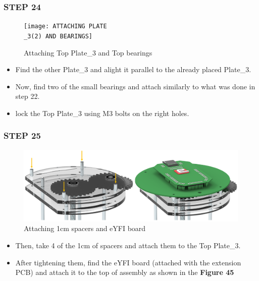 \documentclass[12pt,a4paper,oneside]{book}
\begin{document}
			\subsubsection*{STEP 24}
				\begin{figure}[H]
					\begin{center}
						\texttt{[image: ATTACHING PLATE\\\_3(2) AND BEARINGS]}
						\caption{Attaching Top Plate\_3 and Top bearings}
					\end{center}
				\end{figure}
				\begin{itemize}
					\item Find the other Plate\_3 and alight it parallel to the already placed Plate\_3. 
					\item Now, find two of the small bearings and attach similarly to what was done in step 22. 
					\item lock the Top Plate\_3 using M3 bolts on the right holes.  
				\end{itemize}
				
			\subsubsection*{STEP 25}
				\begin{figure}[H]
					\begin{center}
						\includegraphics[scale=0.5]{ATTACHING EYFI AND 1CM SPACERS}
						\caption{Attaching 1cm spacers and eYFI board}
					\end{center}
				\end{figure}
				\begin{itemize}
					\item Then, take 4 of the 1cm of spacers and attach them to the Top Plate\_3.
					\item After tightening them, find the eYFI board (attached with the extension PCB) and attach it to the top of assembly as shown in the \textbf{Figure 45}
				\end{itemize}
				
\end{document}
